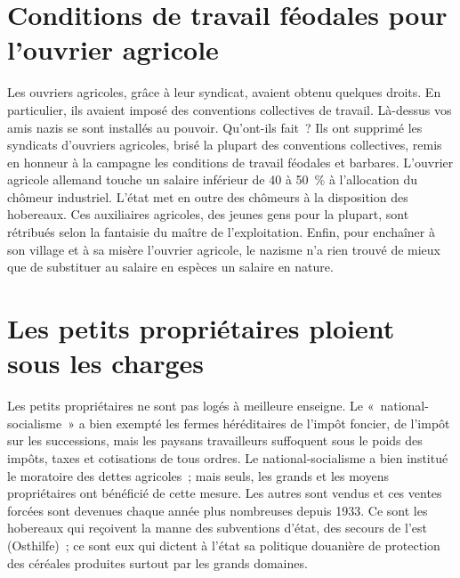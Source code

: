 \documentclass[french,twoside]{book} %
\begin{document}
\section[Conditions de travail féodales pour l’ouvrier agricole]{Conditions de travail féodales pour l’ouvrier agricole}
\noindent Les ouvriers agricoles, grâce à leur syndicat, avaient obtenu quelques droits. En particulier, ils avaient imposé des conventions collectives de travail. Là-dessus vos amis nazis se sont installés au pouvoir. Qu’ont-ils fait ? Ils ont supprimé les syndicats d’ouvriers agricoles, brisé la plupart des conventions collectives, remis en honneur à la campagne les conditions de travail féodales et barbares. L’ouvrier agricole allemand touche un salaire inférieur de 40 à 50 \% à l’allocation du chômeur industriel. L’état met en outre des chômeurs à la disposition des hobereaux. Ces auxiliaires agricoles, des jeunes gens pour la plupart, sont rétribués selon la fantaisie du maître de l’exploitation. Enfin, pour enchaîner à son village et à sa misère l’ouvrier agricole, le nazisme n’a rien trouvé de mieux que de substituer au salaire en espèces un salaire en nature.
\section[Les petits propriétaires ploient sous les charges]{Les petits propriétaires ploient sous les charges}
\noindent Les petits propriétaires ne sont pas logés à meilleure enseigne. Le « national-socialisme » a bien exempté les fermes héréditaires de l’impôt foncier, de l’impôt sur les successions, mais les paysans travailleurs suffoquent sous le poids des impôts, taxes et cotisations de tous ordres. Le national-socialisme a bien institué le moratoire des dettes agricoles ; mais seuls, les grands et les moyens propriétaires ont bénéficié de cette mesure. Les autres sont vendus et ces ventes forcées sont devenues chaque année plus nombreuses depuis 1933. Ce sont les hobereaux qui reçoivent la manne des subventions d’état, des secours de l’est (Osthilfe) ; ce sont eux qui dictent à l’état sa politique douanière de protection des céréales produites surtout par les grands domaines.
\end{document}
